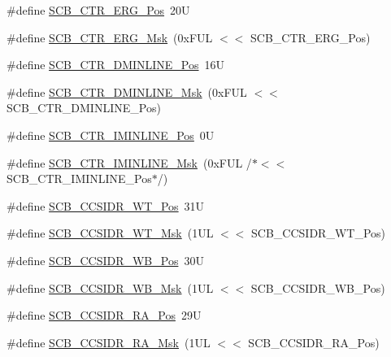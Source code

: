 \begin{DoxyCompactItemize}
\#define \mbox{\hyperlink{group___c_m_s_i_s___s_c_b_ga7692042fbaab5852ca60f6c2d659f724}{S\+C\+B\+\_\+\+C\+T\+R\+\_\+\+E\+R\+G\+\_\+\+Pos}}~20U
\item 
\#define \mbox{\hyperlink{group___c_m_s_i_s___s_c_b_ga02bb1ed5199a32e0ebad001e1b64ac35}{S\+C\+B\+\_\+\+C\+T\+R\+\_\+\+E\+R\+G\+\_\+\+Msk}}~(0x\+F\+U\+L $<$$<$ S\+C\+B\+\_\+\+C\+T\+R\+\_\+\+E\+R\+G\+\_\+\+Pos)
\item 
\#define \mbox{\hyperlink{group___c_m_s_i_s___s_c_b_gae25b69e6ea66c125f703870adabb0d65}{S\+C\+B\+\_\+\+C\+T\+R\+\_\+\+D\+M\+I\+N\+L\+I\+N\+E\+\_\+\+Pos}}~16U
\item 
\#define \mbox{\hyperlink{group___c_m_s_i_s___s_c_b_ga634bb0b270954a68757c86c517de948b}{S\+C\+B\+\_\+\+C\+T\+R\+\_\+\+D\+M\+I\+N\+L\+I\+N\+E\+\_\+\+Msk}}~(0x\+F\+U\+L $<$$<$ S\+C\+B\+\_\+\+C\+T\+R\+\_\+\+D\+M\+I\+N\+L\+I\+N\+E\+\_\+\+Pos)
\item 
\#define \mbox{\hyperlink{group___c_m_s_i_s___s_c_b_ga5be00464e6789da9619947d67d2a1529}{S\+C\+B\+\_\+\+C\+T\+R\+\_\+\+I\+M\+I\+N\+L\+I\+N\+E\+\_\+\+Pos}}~0U
\item 
\#define \mbox{\hyperlink{group___c_m_s_i_s___s_c_b_gac62440e20c39b8022279a4a706ef9aa3}{S\+C\+B\+\_\+\+C\+T\+R\+\_\+\+I\+M\+I\+N\+L\+I\+N\+E\+\_\+\+Msk}}~(0x\+F\+U\+L /$\ast$$<$$<$ S\+C\+B\+\_\+\+C\+T\+R\+\_\+\+I\+M\+I\+N\+L\+I\+N\+E\+\_\+\+Pos$\ast$/)
\item 
\#define \mbox{\hyperlink{group___c_m_s_i_s___s_c_b_ga4eaf5ef29d920023de2cf53b25d0d56c}{S\+C\+B\+\_\+\+C\+C\+S\+I\+D\+R\+\_\+\+W\+T\+\_\+\+Pos}}~31U
\item 
\#define \mbox{\hyperlink{group___c_m_s_i_s___s_c_b_ga9089551a75985fa7cf051062ed2d62b9}{S\+C\+B\+\_\+\+C\+C\+S\+I\+D\+R\+\_\+\+W\+T\+\_\+\+Msk}}~(1\+U\+L $<$$<$ S\+C\+B\+\_\+\+C\+C\+S\+I\+D\+R\+\_\+\+W\+T\+\_\+\+Pos)
\item 
\#define \mbox{\hyperlink{group___c_m_s_i_s___s_c_b_ga4a32c31034cf30f6fe4dfaa9d0d6a6af}{S\+C\+B\+\_\+\+C\+C\+S\+I\+D\+R\+\_\+\+W\+B\+\_\+\+Pos}}~30U
\item 
\#define \mbox{\hyperlink{group___c_m_s_i_s___s_c_b_gaa9c0516faf8b9c7ab4151823c48f39b6}{S\+C\+B\+\_\+\+C\+C\+S\+I\+D\+R\+\_\+\+W\+B\+\_\+\+Msk}}~(1\+U\+L $<$$<$ S\+C\+B\+\_\+\+C\+C\+S\+I\+D\+R\+\_\+\+W\+B\+\_\+\+Pos)
\item 
\#define \mbox{\hyperlink{group___c_m_s_i_s___s_c_b_ga379743eea011cede0032ecb7812b51e1}{S\+C\+B\+\_\+\+C\+C\+S\+I\+D\+R\+\_\+\+R\+A\+\_\+\+Pos}}~29U
\item 
\#define \mbox{\hyperlink{group___c_m_s_i_s___s_c_b_gaa77f28cbf94b44c1114a66e05cc43255}{S\+C\+B\+\_\+\+C\+C\+S\+I\+D\+R\+\_\+\+R\+A\+\_\+\+Msk}}~(1\+U\+L $<$$<$ S\+C\+B\+\_\+\+C\+C\+S\+I\+D\+R\+\_\+\+R\+A\+\_\+\+Pos)
$$
\end{DoxyCompactItemize}
